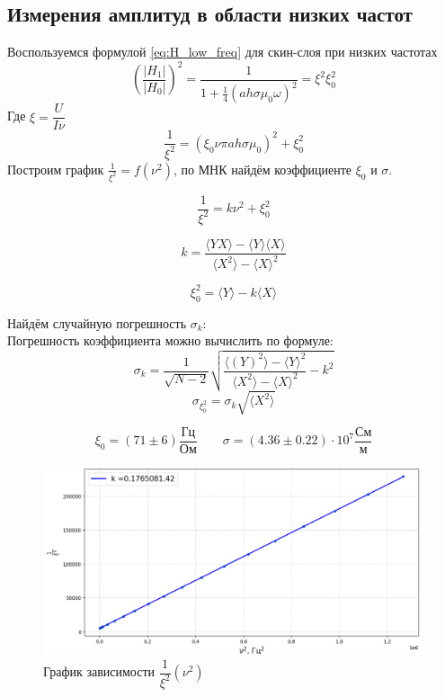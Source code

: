 \documentclass[a4paper,12pt]{article}
\begin{document}
\subsection{Измерения амплитуд в области низких частот}


Воспользуемся формулой \eqref{eq:H_low_freq} для скин-слоя при низких частотах
\begin{equation}
    \left(\dfrac{|H_1|}{|H_0|}\right)^2 = \dfrac{1}{1+ \frac{1}{4} (a h \sigma \mu_0 \omega )^2 } = \xi^2 \xi_0^2
\end{equation}
Где $\xi = \dfrac{U}{I\nu}$
\begin{equation}
    \dfrac{1}{\xi^2} = (\xi_0\nu\pi a h \sigma \mu_0)^2 + \xi_0^2
\end{equation}
Построим график $\frac{1}{\xi^2} = f(\nu^2)$, по МНК найдём коэффициенте $\xi_0$ и $\sigma$.


$$
\dfrac{1}{\xi^2} = k\nu^2 + \xi_0^2
$$

$$
k = \frac{\langle Y X\rangle - \langle Y \rangle \langle X \rangle}{\langle X^2 \rangle - \langle X \rangle^2}
$$

$$
\xi_0^2 = \langle Y \rangle - k \langle X \rangle
$$ 

Найдём случайную погрешность $\sigma_{k}$:\\
Погрешность коэффициента можно вычислить по формуле:
$$
\sigma_{k} = \frac{1}{\sqrt{N-2}}\sqrt{\frac{\langle (Y)^2 \rangle - \langle Y \rangle ^2}{\langle X^2 \rangle - \langle X \rangle ^2} - k^2}
$$
$$
\sigma_{\xi_0^2} = \sigma_k \sqrt{\langle X^2 \rangle}
$$

$$
    \xi_0 =  (71 \pm 6) \dfrac{\text{Гц}}{\text{Ом}} 
    \qquad \sigma = (4.36 \pm 0.22) \cdot 10^7 \dfrac{\text{См}}{\text{м}}
$$


\begin{figure}[H]
    \centering
    \includegraphics[width=1\textwidth]{1_grf}
    \caption{График зависимости $\dfrac{1}{\xi^2}(\nu^2)$}
    \label{1.1}
\end{figure}
\end{document}
